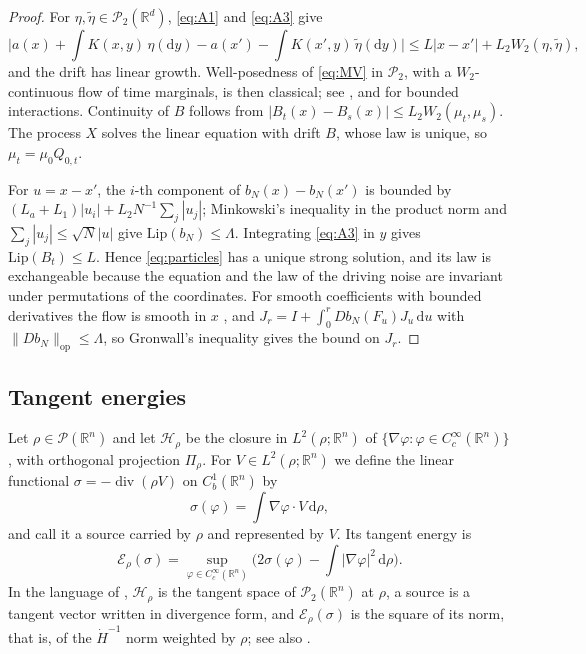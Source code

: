 \documentclass[11pt]{amsart}
\numberwithin{equation}{section}
\theoremstyle{plain}
\theoremstyle{remark}
\newcommand{\R}{\mathbb{R}}
\newcommand{\cP}{\mathcal{P}}
\newcommand{\cE}{\mathcal{E}}
\newcommand{\cH}{\mathcal{H}}
\newcommand{\W}{W_2}
\newcommand{\op}{\mathrm{op}}
\newcommand{\Lip}{\mathrm{Lip}}
\newcommand{\dd}{\mathrm{d}}
\DeclareMathOperator{\dv}{div}
\begin{document}
\begin{proof}
For $\eta,\tilde\eta\in\cP_2(\R^d)$, \eqref{eq:A1} and \eqref{eq:A3} give
\[
\Big|a(x)+\int K(x,y)\,\eta(\dd y)-a(x')-\int K(x',y)\,\tilde\eta(\dd y)\Big|\le L|x-x'|+L_2\W(\eta,\tilde\eta),
\]
and the drift has linear growth. Well-posedness of \eqref{eq:MV} in $\cP_2$, with a $\W$-continuous flow of time marginals, is then classical; see \cite[Theorem~4.21]{CD18}, and \cite[Chapter~I]{Szn91} for bounded interactions. Continuity of $B$ follows from $|B_t(x)-B_s(x)|\le L_2\W(\mu_t,\mu_s)$. The process $X$ solves the linear equation with drift $B$, whose law is unique, so $\mu_t=\mu_0Q_{0,t}$.

For $u=x-x'$, the $i$-th component of $b_N(x)-b_N(x')$ is bounded by $(L_a+L_1)|u_i|+L_2N^{-1}\sum_j|u_j|$; Minkowski's inequality in the product norm and $\sum_j|u_j|\le\sqrt N|u|$ give $\Lip(b_N)\le\Lambda$. Integrating \eqref{eq:A3} in $y$ gives $\Lip(B_t)\le L$. Hence \eqref{eq:particles} has a unique strong solution, and its law is exchangeable because the equation and the law of the driving noise are invariant under permutations of the coordinates. For smooth coefficients with bounded derivatives the flow is smooth in $x$ \cite[Chapter~4]{Kun90}, and $J_r=I+\int_0^rDb_N(F_u)J_u\,\dd u$ with $\|Db_N\|_\op\le\Lambda$, so Gronwall's inequality gives the bound on $J_r$.
\end{proof}

\subsection{Tangent energies}\label{sec:tangent}
Let $\rho\in\cP(\R^n)$ and let $\cH_\rho$ be the closure in $L^2(\rho;\R^n)$ of $\{\nabla\varphi:\varphi\in C^\infty_c(\R^n)\}$, with orthogonal projection $\Pi_\rho$. For $V\in L^2(\rho;\R^n)$ we define the linear functional $\sigma=-\dv(\rho V)$ on $C^1_b(\R^n)$ by
\[
\sigma(\varphi)=\int\nabla\varphi\cdot V\,\dd\rho,
\]
and call it a source carried by $\rho$ and represented by $V$. Its tangent energy is
\begin{equation}\label{eq:energy-def}
\cE_\rho(\sigma)=\sup_{\varphi\in C^\infty_c(\R^n)}\Big(2\sigma(\varphi)-\int|\nabla\varphi|^2\,\dd\rho\Big).
\end{equation}
In the language of \cite[Section~8.4]{AGS08}, $\cH_\rho$ is the tangent space of $\cP_2(\R^n)$ at $\rho$, a source is a tangent vector written in divergence form, and $\cE_\rho(\sigma)$ is the square of its norm, that is, of the $\dot H^{-1}$ norm weighted by $\rho$; see also \cite{Ott01,Loe06,Pey18}.
\end{document}
